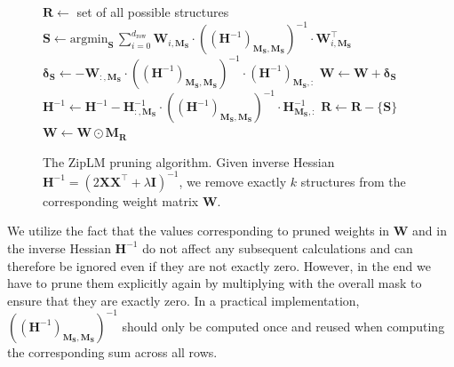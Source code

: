 \documentclass{article}
\theoremstyle{plain}
\theoremstyle{definition}
\theoremstyle{remark}
\begin{document}
\begin{figure}
    \begin{minipage}{0.6\textwidth}
    \vspace{-1.8em}
        \begin{algorithm}[H]
            \centering
            \caption{The ZipLM pruning algorithm. Given inverse Hessian $\mathbf{H}^{-1} = (2 \mathbf{X} \mathbf{X}^\top + \lambda \mathbf{I})^{-1}$, we remove exactly $k$ structures from the corresponding weight matrix $\mathbf{W}$.}
            \small
            \label{alg:ziplm}
            \begin{algorithmic}
                \STATE $\mathbf{R} \gets$ set of all possible structures
                    \STATE $\mathbf{S} \gets \text{argmin}_\mathbf{S} \, \sum_{i = 0}^{d_\text{row}} \mathbf{W}_{i,\mathbf{M_S}} \cdot ((\mathbf{H}^{-1})_{\mathbf{M_S},\mathbf{M_S}})^{-1} \cdot \mathbf{W}^\top_{i,\mathbf{M_S}}$
                    \STATE $\boldsymbol{\delta_S} \gets -\mathbf{W}_{:, \mathbf{M_S}} \cdot ((\mathbf{H}^{-1})_{\mathbf{M_S},\mathbf{M_S}})^{-1} \cdot (\mathbf{H}^{-1})_{\mathbf{M_S}, :}$
                    \STATE $\mathbf{W} \gets \mathbf{W} + \boldsymbol{\delta_S}$
                    \STATE $\mathbf{H}^{-1} \gets \mathbf{H}^{-1} - \mathbf{H}^{-1}_{:, \mathbf{M_S}} \cdot ((\mathbf{H}^{-1})_{\mathbf{M_S},\mathbf{M_S}})^{-1} \cdot \mathbf{H}^{-1}_{\mathbf{M_S}, :}$
                    \STATE $\mathbf{R} \gets \mathbf{R} - \{\mathbf{S}\}$
                \ENDFOR
                \STATE $\mathbf{W} \gets \mathbf{W} \odot \mathbf{M_R}$
            \end{algorithmic}
        \end{algorithm}
    \end{minipage}
\end{figure}

We utilize the fact that the values corresponding to pruned weights in $\mathbf{W}$ and in the inverse Hessian $\mathbf{H}^{-1}$ do not affect any subsequent calculations and can therefore be ignored even if they are not exactly zero. However, in the end we have to prune them explicitly again by multiplying with the overall mask to ensure that they are exactly zero. In a practical implementation, $((\mathbf{H}^{-1})_{\mathbf{M_S},\mathbf{M_S}})^{-1}$ should only be computed once and reused when computing the corresponding sum across all rows.
\end{document}
